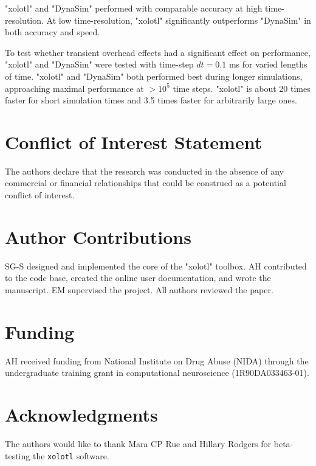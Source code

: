\documentclass{frontiersSCNS} %
\begin{document}
"xolotl" and "DynaSim" performed with comparable accuracy at high time-resolution. At low time-resolution, "xolotl" significantly outperforms "DynaSim" in both accuracy and speed.

To test whether transient overhead effects had a significant effect on performance, "xolotl" and "DynaSim" were tested with time-step $dt = 0.1$ ms for varied lengths of time. "xolotl" and "DynaSim" both performed best during longer simulations, approaching maximal performance at $>10^5$ time steps. "xolotl" is about 20 times faster for short simulation times and 3.5 times faster for arbitrarily large ones.

\section*{Conflict of Interest Statement}

The authors declare that the research was conducted in the absence of any commercial or financial relationships that could be construed as a potential conflict of interest.

\section*{Author Contributions}

SG-S designed and implemented the core of the "xolotl" toolbox. AH contributed to the code base, created the online user documentation, and wrote the manuscript. EM supervised the project. All authors reviewed the paper.

\section*{Funding}

AH received funding from National Institute on Drug Abuse (NIDA) through the undergraduate training grant in computational neuroscience (1R90DA033463-01).

\section*{Acknowledgments}
The authors would like to thank Mara CP Rue and Hillary Rodgers for beta-testing the \texttt{xolotl} software.
\end{document}
